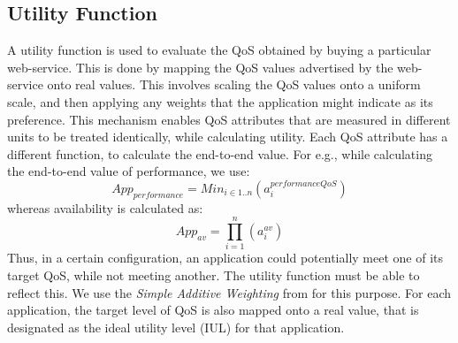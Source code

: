 \documentclass[10pt,journal,compsoc]{IEEEtran}
\begin{document}
\subsection{Utility Function}
A utility function is used to evaluate the QoS obtained by buying a particular web-service. This is done by mapping the QoS values advertised by the web-service onto real values. This involves scaling the QoS values onto a uniform scale, and then applying any weights that the application might indicate as its preference. This mechanism enables QoS attributes that are measured in different units to be treated identically, while calculating utility. Each QoS attribute has a different function, to calculate the end-to-end value. For e.g., while calculating the end-to-end value of performance, we use:
	\begin{equation} 
		App_{performance}  = Min_{i \in {1..n}}(a_{i}^{performanceQoS})
	\end{equation}
whereas availability is calculated as: 
	\begin{equation}
		App_{av} = \prod_{i=1}^{n}(a_{i}^{av})	    
	\end{equation}
Thus, in a certain configuration, an application could potentially meet one of its target QoS, while not meeting another. The utility function must be able to reflect this. We use the \textit{Simple Additive Weighting} from \cite{Yoon1995Multiple} for this purpose.  For each application, the target level of QoS is also mapped onto a real value, that is designated as the ideal utility level (IUL) for that application. 
\end{document}
